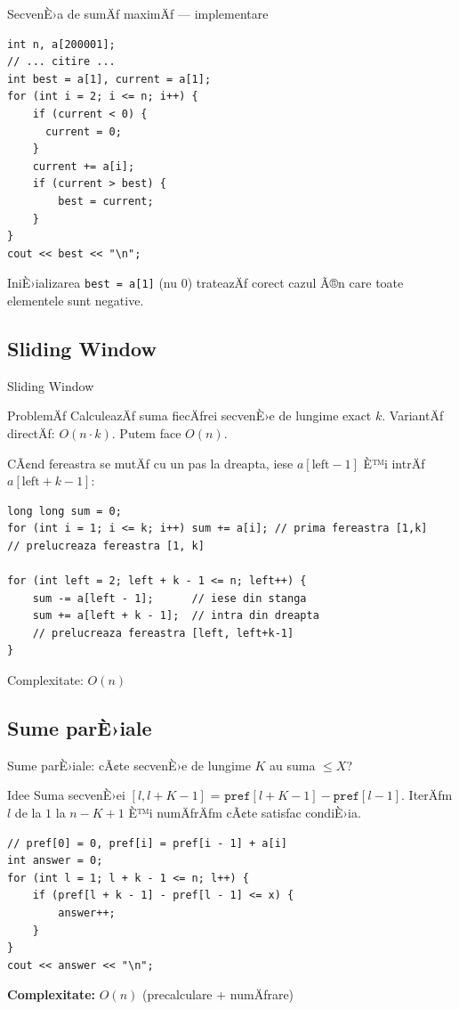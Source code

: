 \documentclass{beamer}
\begin{document}
\begin{frame}[fragile]{SecvenÈ›a de sumÄƒ maximÄƒ --- implementare}
  \begin{lstlisting}
int n, a[200001];
// ... citire ...
int best = a[1], current = a[1];
for (int i = 2; i <= n; i++) {
    if (current < 0) {
      current = 0;
    }
    current += a[i];
    if (current > best) {
        best = current;
    }
}
cout << best << "\n";
  \end{lstlisting}
  IniÈ›ializarea \texttt{best = a[1]} (nu $0$) trateazÄƒ corect cazul
  Ã®n care toate elementele sunt negative.
\end{frame}

\subsection{Sliding Window}

\begin{frame}{Sliding Window}
  \begin{block}{ProblemÄƒ}
    CalculeazÄƒ suma fiecÄƒrei secvenÈ›e de lungime exact $k$.
    VariantÄƒ directÄƒ: $O(n \cdot k)$. Putem face $O(n)$.
  \end{block}
  CÃ¢nd fereastra se mutÄƒ cu un pas la dreapta, iese $a[\text{left}-1]$
  È™i intrÄƒ $a[\text{left}+k-1]$:
  \begin{lstlisting}
long long sum = 0;
for (int i = 1; i <= k; i++) sum += a[i]; // prima fereastra [1,k]
// prelucreaza fereastra [1, k]

for (int left = 2; left + k - 1 <= n; left++) {
    sum -= a[left - 1];      // iese din stanga
    sum += a[left + k - 1];  // intra din dreapta
    // prelucreaza fereastra [left, left+k-1]
}
  \end{lstlisting}
  \begin{block}{Complexitate: $O(n)$}
  \end{block}
\end{frame}

\subsection{Sume parÈ›iale}

\begin{frame}[fragile]{Sume parÈ›iale: cÃ¢te secvenÈ›e de lungime $K$ au suma $\leq X$?}
  \begin{block}{Idee}
    Suma secvenÈ›ei $[l, l{+}K{-}1]$ = $\texttt{pref}[l+K-1] - \texttt{pref}[l-1]$.
    IterÄƒm $l$ de la $1$ la $n{-}K{+}1$ È™i numÄƒrÄƒm cÃ¢te satisfac condiÈ›ia.
  \end{block}
  \medskip
  \begin{lstlisting}
// pref[0] = 0, pref[i] = pref[i - 1] + a[i]
int answer = 0;
for (int l = 1; l + k - 1 <= n; l++) {
    if (pref[l + k - 1] - pref[l - 1] <= x) {
        answer++;
    }
}
cout << answer << "\n";
  \end{lstlisting}
  \textbf{Complexitate:} $O(n)$ (precalculare + numÄƒrare)
\end{frame}
\end{document}
